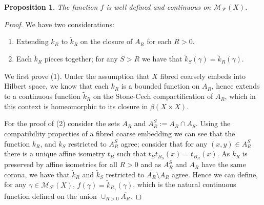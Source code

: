 \documentclass[preprint]{elsarticle}
\theoremstyle{plain}
\newtheorem{proposition}[theorem]{Proposition}%
\theoremstyle{definition}%
\theoremstyle{remark}%
\begin{document}
\begin{proposition}\label{prop:wd}
The function $f$ is well defined and continuous on $\mathcal{M}_{\mathcal{F}}(X)$.
\end{proposition}
\begin{proof}
We have two considerations:
\begin{enumerate}
\item Extending $k_{R}$ to $\tilde{k}_{R}$ on the closure of $A_{R}$ for each $R>0$.
\item Each $\tilde{k}_{R}$ pieces together; for any $S>R$ we have that $\tilde{k}_{S}(\gamma)=\tilde{k}_{R}(\gamma)$.
\end{enumerate}
We first prove (1). Under the assumption that $X$ fibred coarsely embeds into Hilbert space, we know that each $k_{R}$ is a bounded function on $A_{R}$, hence extends to a continuous function $\tilde{k}_{R}$ on the Stone-Cech compactification of $A_{R}$, which in this context is homeomorphic to its closure in $\beta(X \times X)$. 

For the proof of (2) consider the sets $A_{R}$ and $A_{R}^{S}:=A_{R}\cap A_{S}$. Using the compatibility properties of a fibred coarse embedding we can see that the function $k_{R}$, and $k_{S}$ restricted to $A_{R}^{S}$ agree; consider that for any $(x,y)\in A_{R}^{S}$ there is a unique affine isometry $t_{B}$ such that $t_{B}t_{B_{S}}(x) = t_{B_{R}}(x)$. As $k_{R}$ is preserved by affine isometries for all $R>0$ and as $A_{R}^{S}$ and $A_{R}$ have the same corona, we have that $\tilde{k}_{R}$ and $\tilde{k}_{S}$ restricted to $\overline{A_{R}}\setminus A_{R}$ agree. Hence we can define, for any $\gamma \in \mathcal{M}_{\mathcal{F}}(X)$, $f(\gamma) = \tilde{k}_{R_{\gamma}}(\gamma)$, which is the natural continuous function defined on the union $\cup_{R>0}\overline{A_{R}}$.
\end{proof}
\end{document}
